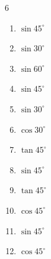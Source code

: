 \begin{multicols}{6}
\begin{enumerate}

\columnbreak %

  \item $\displaystyle \sin{45^\circ}$


  \item $\displaystyle \sin{30^\circ}$


  \item $\displaystyle \sin{60^\circ}$


  \item $\displaystyle \sin{45^\circ}$


  \item $\displaystyle \sin{30^\circ}$


  \item $\displaystyle \cos{30^\circ}$


  \item $\displaystyle \tan{45^\circ}$

        \phantom{$\displaystyle =1$}

  \item $\displaystyle \sin{45^\circ}$


  \item $\displaystyle \tan{45^\circ}$

        \phantom{$\displaystyle =1$}

  \item $\displaystyle \cos{45^\circ}$


  \item $\displaystyle \sin{45^\circ}$


  \item $\displaystyle \cos{45^\circ}$



\end{enumerate}
\end{multicols}
